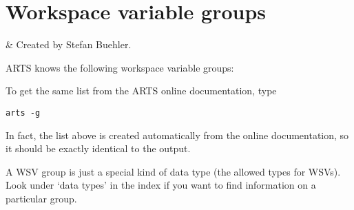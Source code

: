 \chapter{Workspace variable groups}
\label{app:groups}


 & Created by Stefan Buehler. \\
\stophistory

ARTS knows the following workspace variable groups:


\noindent
To get the same list from the ARTS online documentation, type

\begin{verbatim}
arts -g
\end{verbatim}

\noindent
In fact, the list above is created automatically from the online
documentation, so it should be exactly identical to the
 output. 

A WSV group is just a special kind of data type (the allowed types for
WSVs). Look under `data types' in the index if you want to find
information on a particular group.


